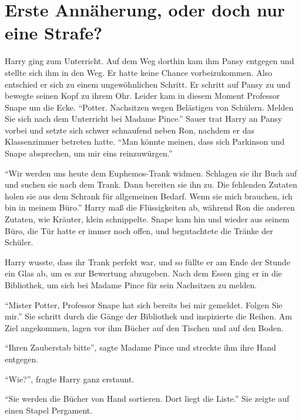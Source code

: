 \chapter{Erste Annäherung, oder doch nur eine Strafe?}


Harry ging zum Unterricht. Auf dem Weg dorthin kam ihm Pansy entgegen und stellte sich ihm in den Weg. Er hatte keine Chance vorbeizukommen. Also entschied er sich zu einem ungewöhnlichen Schritt. Er schritt auf Pansy zu und bewegte seinen Kopf zu ihrem Ohr. Leider kam in diesem Moment Professor Snape um die Ecke. \enquote{Potter. Nachsitzen wegen Belästigen von Schülern. Melden Sie sich nach dem Unterricht bei Madame Pince.} Sauer trat Harry an Pansy vorbei und setzte sich schwer schnaufend neben Ron, nachdem er das Klassenzimmer betreten hatte. \enquote{Man könnte meinen, dass sich Parkinson und Snape absprechen, um mir eins reinzuwürgen.}

\enquote{Wir werden uns heute dem Euphemos-Trank widmen. Schlagen sie ihr Buch auf und suchen sie nach dem Trank. Dann bereiten sie ihn zu. Die fehlenden Zutaten holen sie aus dem Schrank für allgemeinen Bedarf. Wenn sie mich brauchen, ich bin in meinem Büro.} Harry maß die Flüssigkeiten ab, während Ron die anderen Zutaten, wie Kräuter, klein schnippelte. Snape kam hin und wieder aus seinem Büro, die Tür hatte er immer noch offen, und begutachtete die Tränke der Schüler.

Harry wusste, dass ihr Trank perfekt war, und so füllte er am Ende der Stunde ein Glas ab, um es zur Bewertung abzugeben. Nach dem Essen ging er in die Bibliothek, um sich bei Madame Pince für sein Nachsitzen zu melden.

\enquote{Mister Potter, Professor Snape hat sich bereits bei mir gemeldet. Folgen Sie mir.} Sie schritt durch die Gänge der Bibliothek und inspizierte die Reihen. Am Ziel angekommen, lagen vor ihm Bücher auf den Tischen und auf den Boden.

\enquote{Ihren Zauberstab bitte}, sagte Madame Pince und streckte ihm ihre Hand entgegen.

\enquote{Wie?}, fragte Harry ganz erstaunt.

\enquote{Sie werden die Bücher von Hand sortieren. Dort liegt die Liste.} Sie zeigte auf einen Stapel Pergament.

